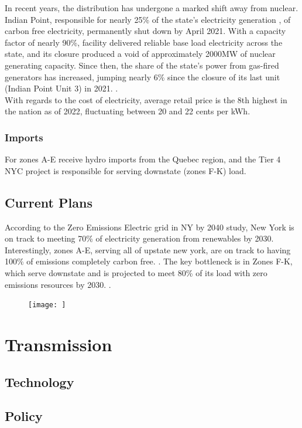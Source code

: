 \documentclass[plain]{article}
\newcommand{\1}{\mathbbm{1}}
\begin{document}
\missingfigure{}
In recent years, the distribution has undergone a marked shift away from nuclear. Indian Point, responsible for nearly 25\% of the state's electricity generation \cite{mcgeehan_indian_2021}, of carbon free electricity, permanently shut down by April 2021. With a capacity factor of nearly 90\%, facility delivered reliable base load electricity across the state, and its closure produced a void of approximately 2000MW of nuclear generating capacity. Since then, the share of the state's power from gas-fired generators has increased, jumping nearly 6\% since the closure of its last unit (Indian Point Unit 3) in 2021. .
\\
With regards to the cost of electricity, average retail price is the 8th highest in the nation as of 2022, fluctuating between 20 and 22 cents per kWh.

\subsubsection{Imports}
For zones A-E receive hydro imports from the Quebec region, and the Tier 4 NYC project is responsible for serving downstate (zones F-K) load.
\subsection{Current Plans}
According to the Zero Emissions Electric grid in NY by 2040 study, New York is on track to meeting 70\% of electricity generation from renewables by 2030. Interestingly, zones A-E, serving all of upstate new york, are on track to having 100\% of emissions completely carbon free. . The key bottleneck is in Zones F-K, which serve downstate and is projected to meet 80\% of its load with zero emissions resources by 2030. .


\begin{figure}[H]
	\centering
	\texttt{[image: ]}
	\caption{}
	\label{fig:}
\end{figure}

\section{Transmission}


\subsection{Technology}

\subsection{Policy}
\end{document}

